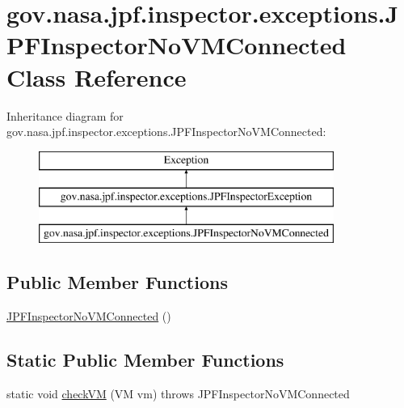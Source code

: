 \hypertarget{classgov_1_1nasa_1_1jpf_1_1inspector_1_1exceptions_1_1_j_p_f_inspector_no_v_m_connected}{}\section{gov.\+nasa.\+jpf.\+inspector.\+exceptions.\+J\+P\+F\+Inspector\+No\+V\+M\+Connected Class Reference}
\label{classgov_1_1nasa_1_1jpf_1_1inspector_1_1exceptions_1_1_j_p_f_inspector_no_v_m_connected}
Inheritance diagram for gov.\+nasa.\+jpf.\+inspector.\+exceptions.\+J\+P\+F\+Inspector\+No\+V\+M\+Connected\+:\begin{figure}[H]
\begin{center}
\leavevmode
\includegraphics[height=3.000000cm]{classgov_1_1nasa_1_1jpf_1_1inspector_1_1exceptions_1_1_j_p_f_inspector_no_v_m_connected}
\end{center}
\end{figure}
\subsection*{Public Member Functions}
\begin{DoxyCompactItemize}
\item 
\hyperlink{classgov_1_1nasa_1_1jpf_1_1inspector_1_1exceptions_1_1_j_p_f_inspector_no_v_m_connected_a65417fb5675d3d20e566b2ca6e1b10b8}{J\+P\+F\+Inspector\+No\+V\+M\+Connected} ()
\end{DoxyCompactItemize}
\subsection*{Static Public Member Functions}
\begin{DoxyCompactItemize}
\item 
static void \hyperlink{classgov_1_1nasa_1_1jpf_1_1inspector_1_1exceptions_1_1_j_p_f_inspector_no_v_m_connected_a05679229247c53b88e4382d47a47c149}{check\+VM} (VM vm)  throws J\+P\+F\+Inspector\+No\+V\+M\+Connected 
\end{DoxyCompactItemize}
